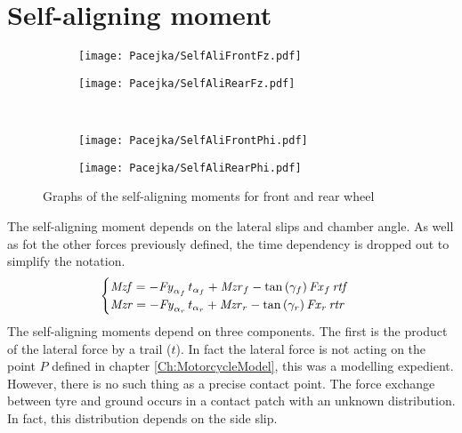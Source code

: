 \section{Self-aligning moment}
%
\begin{figure}[hbt]
    \begin{subfigure}{.5\textwidth}
        \texttt{[image: Pacejka/SelfAliFrontFz.pdf]}
        \caption{}
        \label{fig:sa1a}
    \end{subfigure}%
    \begin{subfigure}{.5\textwidth}
        \texttt{[image: Pacejka/SelfAliRearFz.pdf]}
        \caption{}
        \label{fig:sa1b}
    \end{subfigure}\\
    \begin{subfigure}{.5\textwidth}
        \texttt{[image: Pacejka/SelfAliFrontPhi.pdf]}
        \caption{}
        \label{fig:sa1c}
    \end{subfigure}%
    \begin{subfigure}{.5\textwidth}
        \texttt{[image: Pacejka/SelfAliRearPhi.pdf]}
        \caption{}
        \label{fig:sa1d}
    \end{subfigure}
    \caption{Graphs of the self-aligning moments for front and rear wheel}
\end{figure}
%
%
The self-aligning moment depends on the lateral slips and chamber angle. As well as fot the other forces previously defined, the time dependency is dropped out to simplify the notation.  
%
\begin{equation}
    \begin{cases} 
        {\it Mzf}  =-{\it Fy}_{
        \alpha_{f}}\,t_{\alpha_{f}}+{\it Mzr}_{f}-\tan \left( \gamma_{f}
         \right) {\it Fx}_{f}\,{\it rtf}\\ {\it Mzr} =-{\it Fy}_{\alpha_{r}}\,t_{\alpha_{r}}+{\it Mzr}_{r}-\tan
         \left( \gamma_{r} \right) {\it Fx}_{r}\,{\it rtr}
    \end{cases}          
\end{equation}
%
The self-aligning moments depend on three components. The first is the product of the lateral force by a trail ($t$). In fact the lateral force is not acting on the point $P$ defined in chapter \ref{Ch:MotorcycleModel}, this was a modelling expedient. However, there is no such thing as a precise contact point. The force exchange between tyre and ground occurs in a contact patch with an unknown distribution. In fact, this distribution depends on the side slip.\\
